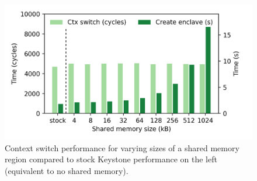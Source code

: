\begin{figure}[t]
    \centering
    \includegraphics[width=\linewidth]{chapters/PIE/images/graphs/ctxswitch.png}
    \vspace{-3em}
    \caption[Context switch performance]{Context switch performance for varying sizes of a shared memory region compared to stock Keystone performance on the left (equivalent to no shared memory).}
    \label{fig:ctxswitches}
\end{figure}



